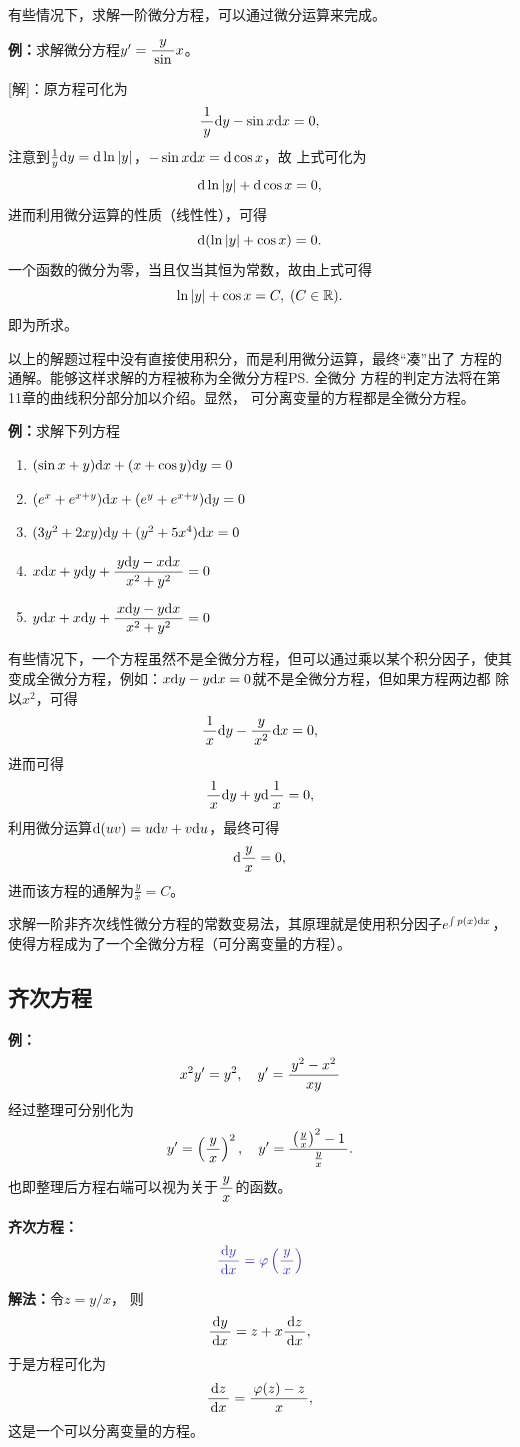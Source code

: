有些情况下，求解一阶微分方程，可以通过微分运算来完成。

{\bf 例：}求解微分方程$y'=\df y\sin x$。

[解]：原方程可化为
$$\df1y\d y-\sin x\d x=0,$$
注意到$\frac1y\d y=\d\ln|y|$，$-\sin x\d x=\d\cos x$，故
上式可化为
$$\d\ln|y|+\d\cos x=0,$$
进而利用微分运算的性质（线性性），可得
$$\d(\ln|y|+\cos x)=0.$$
一个函数的微分为零，当且仅当其恒为常数，故由上式可得
$$\ln|y|+\cos x=C,\;(C\in\mbb{R}).$$
即为所求。\fin

以上的解题过程中没有直接使用积分，而是利用微分运算，最终“凑”出了
方程的通解。能够这样求解的方程被称为{\kaishu 全微分方程}\ps{全微分
方程的判定方法将在第11章的曲线积分部分加以介绍}。显然，
可分离变量的方程都是全微分方程。

{\bf 例：}求解下列方程
\begin{enumerate}[(1)]
  \setlength{\itemindent}{1cm}
  \item $(\sin x+y)\d x+(x+\cos y)\d y=0$
  \item $(e^x+e^{x+y})\d x+(e^y+e^{x+y})\d y=0$
  \item $(3y^2+2xy)\d y+(y^2+5x^4)\d x=0$
  \item $x\d x+y\d y+\df{y\d y-x\d x}{x^2+y^2}=0$
  \item $y\d x+x\d y+\df{x\d y-y\d x}{x^2+y^2}=0$
\end{enumerate}

有些情况下，一个方程虽然不是全微分方程，但可以通过乘以某个{\kaishu 积分因子}，使其
变成全微分方程，例如：$x\d y-y\d x=0$就不是全微分方程，但如果方程两边都
除以$x^2$，可得
$$\df1x\d y-\df y{x^2}\d x=0,$$
进而可得
$$\df1x\d y+y\d\df1x=0,$$
利用微分运算$\d(uv)=u\d v+v\d u$，最终可得
$$\d\df yx=0,$$
进而该方程的通解为$\frac yx=C$。

求解一阶非齐次线性微分方程的常数变易法，其原理就是使用积分因子$e^{\int p(x)\d x}$，
使得方程成为了一个全微分方程（可分离变量的方程）。

\subsection{齐次方程}

{\bf 例：}
$$x^2y'=y^2,\quad y'=\df{y^2-x^2}{xy}$$ 
经过整理可分别化为
$$y'=\left(\df yx\right)^2,\quad
y'=\df{\left(\frac yx\right)^2-1}{\frac yx}.$$
也即整理后方程右端可以视为关于$\df yx$的函数。

\begin{thx}
	{\bf 齐次方程：}
	$${\b\df{\d y}{\d x}=\varphi\left(\df yx\right)}$$

	{\bf 解法：}令$z=y/x$， 则
	$$\df{\d y}{\d x}=z+x\df{\d z}{\d x},$$
	于是方程可化为
	$$\df{\d z}{\d x}=\df{\varphi(z)-z}x,$$
	这是一个可以分离变量的方程。
\end{thx}

